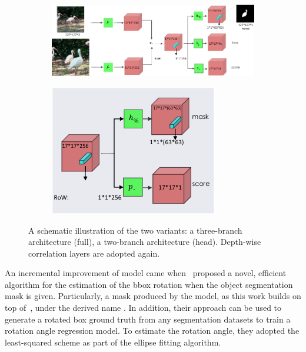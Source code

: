 \begin{figure}[t]
    \centering
    \begin{subfigure}[b]{0.68\textwidth}
        \centering
        \includegraphics[width=\textwidth]{figures/theoretical_foundations/siam_mask_architecture_3_branch.pdf}
        \caption[]{}
    \end{subfigure}
    \hfill
    \begin{subfigure}[b]{0.31\textwidth}
        \centering
        \includegraphics[width=\textwidth]{figures/theoretical_foundations/siam_mask_architecture_2_branch_head.pdf}
        \caption[]{}
    \end{subfigure}
    \caption[\siammask{} architecture]{A schematic illustration of the two \siammask{} variants:  a three-branch architecture (full),  a two-branch architecture (head). Depth-wise correlation layers are adopted again. }
    \label{fig:SiamMaskArchitecture}
\end{figure}

An incremental improvement of \siammask{} model came when~\cite{chen2019rotbboxes} proposed a novel, efficient algorithm for the estimation of the \gls{bbox} rotation when the object segmentation mask is given. Particularly, a mask produced by the \siammask{} model, as this work builds on top of~\cite{wang2019siammask}, under the derived name \siammaske{}. In addition, their approach can be used to generate a rotated box ground truth from any segmentation datasets to train a rotation angle regression model. To estimate the rotation angle, they adopted the least-squared scheme as part of the ellipse fitting algorithm.

